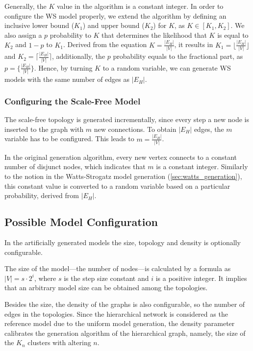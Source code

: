 Generally, the $K$ value in the algorithm is a constant integer. In order to configure the WS model properly, we extend the algorithm by defining an inclusive lower bound ($K_1$) and upper bound ($K_2$) for $K$, as $K\in[K_1, K_2]$. We also assign a $p$ probability to $K$ that determines the likelihood that $K$ is equal to $K_2$ and $1-p$ to $K_1$. Derived from the equation $K = \frac{|E_H|}{|V|}$, it results in $K_1 = \Big\lfloor\frac{|E_H|}{|V|}\Big\rfloor$ and $K_2 = \Big\lceil\frac{|E_H|}{|V|}\Big\rceil$, additionally, the $p$ probability equals to the fractional part, as $p = \Big\{\frac{|E_H|}{|V|}\Big\}$. Hence, by turning $K$ to a random variable, we can generate WS models with the same number of edges as $|E_H|$.

\subsubsection{Configuring the Scale-Free Model}

The scale-free topology is generated incrementally, since every step a new node is inserted to the graph with $m$ new connections. To obtain $|E_H|$ edges, the $m$ variable has to be configured. This leads to $m = \frac{|E_H|}{|V|}$.

In the original generation algorithm, every new vertex connects to a constant number of disjunct nodes, which indicates that $m$ is a constant integer. Similarly to the notion in the Watts-Strogatz model generation (\ref{sec:watts_generation}), this constant value is converted to a random variable based on a particular probability, derived from $|E_H|$.

\subsection{Possible Model Configuration}

In the artificially generated models the size, topology and density is optionally configurable. 

The size of the model---the number of nodes---is calculated by a formula as $|V| = s \cdot 2^i$, where $s$ is the step size constant and $i$ is a positive integer. It implies that an arbitrary model size can be obtained among the topologies.

Besides the size, the density of the graphs is also configurable, so the number of edges in the topologies. Since the hierarchical network is considered as the reference model due to the uniform model generation, the density parameter calibrates the generation algorithm of the hierarchical graph, namely, the size of the $K_n$ clusters with altering $n$. 

